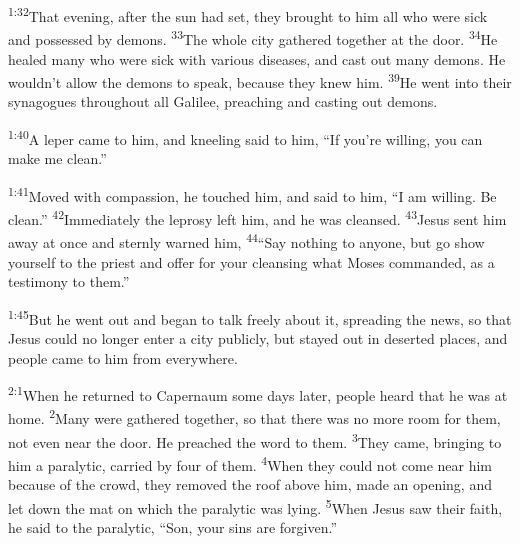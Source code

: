 \documentclass[openany,12pt,english]{book}
\newenvironment{para}{\par\pretolerance=100\tolerance=200\setlength{\emergencystretch}{0.6em}\relax}{\par}
\begin{document}
\begin{para}
    \textsuperscript{1:32}\thinspace{}That eve\-ning, af\-ter the sun had set, they brought to him all who were sick and pos\-sessed by demons.
    \textsuperscript{33}\thinspace{}The whole cit\-y gathered to\-geth\-er at the door.
    \textsuperscript{34}\thinspace{}He healed man\-y who were sick with var\-i\-ous diseases, and cast out man\-y demons. He would\-n't al\-low the demons to speak, be\-cause they knew him.
    \textsuperscript{39}\thinspace{}He went in\-to their synagogues through\-out all Gal\-i\-lee, preaching and cast\-ing out demons.
\end{para}

\bigskip{}

\begin{para}
    \textsuperscript{1:40}\thinspace{}A lep\-er came to him, and kneel\-ing said to him, “If you're will\-ing, you can make me clean.”
\end{para}

\begin{para}
    \textsuperscript{1:41}\thinspace{}Moved with com\-pas\-sion, he touched him, and said to him, “I am will\-ing. Be clean.”
    \textsuperscript{42}\thinspace{}Im\-me\-di\-ate\-ly the lep\-ro\-sy left him, and he was cleansed.
    \textsuperscript{43}\thinspace{}Jesus sent him a\-way at once and sternly warned him,
    \textsuperscript{44}\thinspace{}“Say noth\-ing to any\-one, but go show your\-self to the priest and of\-fer for your cleans\-ing what Mo\-ses commanded, as a tes\-ti\-mo\-ny to them.”
\end{para}

\begin{para}
    \textsuperscript{1:45}\thinspace{}But he went out and be\-gan to talk free\-ly a\-bout it, spreading the news, so that Jesus could no long\-er en\-ter a cit\-y pub\-lic\-ly, but stayed out in de\-sert\-ed places, and peo\-ple came to him from eve\-ry\-where.
\end{para}

\bigskip{}

\begin{para}
    \textsuperscript{2:1}\thinspace{}When he returned to Capernaum some days lat\-er, peo\-ple heard that he was at home.
    \textsuperscript{2}\thinspace{}Man\-y were gathered to\-geth\-er, so that there was no more room for them, not e\-ven near the door. He preached the word to them.
    \textsuperscript{3}\thinspace{}They came, bring\-ing to him a par\-a\-lyt\-ic, car\-ried by four of them.
    \textsuperscript{4}\thinspace{}When they could not come near him be\-cause of the crowd, they re\-moved the roof a\-bove him, made an o\-pen\-ing, and let down the mat on which the par\-a\-lyt\-ic was ly\-ing.
    \textsuperscript{5}\thinspace{}When Jesus saw their faith, he said to the par\-a\-lyt\-ic, “Son, your sins are for\-giv\-en.”
\end{para}
\end{document}
